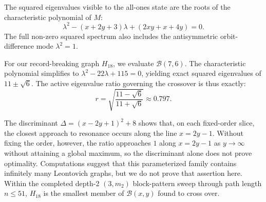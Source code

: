 The squared eigenvalues visible to the all-ones state are the roots of the
characteristic polynomial of $M$:
\begin{equation}
  \lambda^2 - (x + 2y + 3)\lambda + (2xy + x + 4y) = 0.
\end{equation}
The full non-zero squared spectrum also includes the antisymmetric
orbit-difference mode $\lambda^2 = 1$.

For our record-breaking graph $H_{18}$, we evaluate $\mathcal{B}(7,6)$. The
characteristic polynomial simplifies to $\lambda^2 - 22\lambda + 115 = 0$,
yielding exact squared eigenvalues of $11 \pm \sqrt{6}$. The active eigenvalue
ratio governing the crossover is thus exactly:
\begin{equation}
  r = \sqrt{\frac{11 - \sqrt{6}}{11 + \sqrt{6}}} \approx 0.797.
\end{equation}

The discriminant $\Delta = (x-2y+1)^2 + 8$ shows that, on each fixed-order
slice, the closest approach to resonance occurs along the line
$x = 2y - 1$. Without fixing the order, however, the ratio approaches $1$
along $x = 2y - 1$ as $y \to \infty$ without attaining a global maximum, so
the discriminant alone does not prove optimality. Computations suggest that
this parameterized family contains infinitely many Leontovich graphs, but we
do not prove that assertion here. Within the completed
depth-2 $(3,m_2)$ block-pattern sweep through path length $n \le 51$,
$H_{18}$ is the smallest member of $\mathcal{B}(x,y)$ found to cross over.

